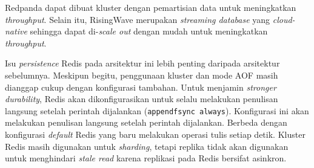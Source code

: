 Redpanda dapat dibuat kluster dengan pemartisian data untuk meningkatkan \textit{throughput}. Selain itu, RisingWave merupakan \textit{streaming database} yang \textit{cloud-native} sehingga dapat di-\textit{scale out} dengan mudah untuk meningkatkan \textit{throughput}.

Isu \textit{persistence} Redis pada arsitektur ini lebih penting daripada arsitektur sebelumnya. Meskipun begitu, penggunaan kluster dan mode AOF masih dianggap cukup dengan konfigurasi tambahan. Untuk menjamin \textit{stronger durability}, Redis akan dikonfigurasikan untuk selalu melakukan penulisan langsung setelah perintah dijalankan (\texttt{appendfsync always}). Konfigurasi ini akan melakukan penulisan langsung setelah perintah dijalankan. Berbeda dengan konfigurasi \textit{default} Redis yang baru melakukan operasi tulis setiap detik. Kluster Redis masih digunakan untuk \textit{sharding}, tetapi replika tidak akan digunakan untuk menghindari \textit{stale read} karena replikasi pada Redis bersifat asinkron.